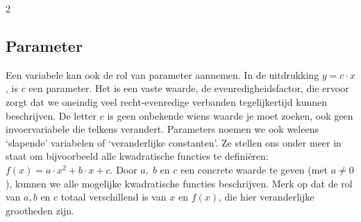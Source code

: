 \begin{multicols}{2}
\subsection{Parameter}
Een variabele kan ook de rol van parameter aannemen. In de uitdrukking $y = c\cdot x$, is $c$ een parameter. Het is een vaste waarde, de evenredigheidsfactor, die ervoor zorgt dat we oneindig veel recht-evenredige verbanden tegelijkertijd kunnen beschrijven. De letter $c$ is geen onbekende wiens waarde je moet zoeken, ook geen invoervariabele die telkens verandert. Parameters noemen we ook weleens `slapende' variabelen of `veranderlijke constanten'. Ze stellen ons onder meer in staat om bijvoorbeeld alle kwadratische functies te definiëren: $f(x)=a\cdot x^2+b\cdot x+c$. Door $a,\;b$ en $c$ een concrete waarde te geven (met $a\not = 0$), kunnen we alle mogelijke kwadratische functies beschrijven. Merk op dat de rol van $a, b$ en $c$ totaal verschillend is van $x$ en $f(x)$, die hier veranderlijke grootheden zijn. 

\end{multicols}
